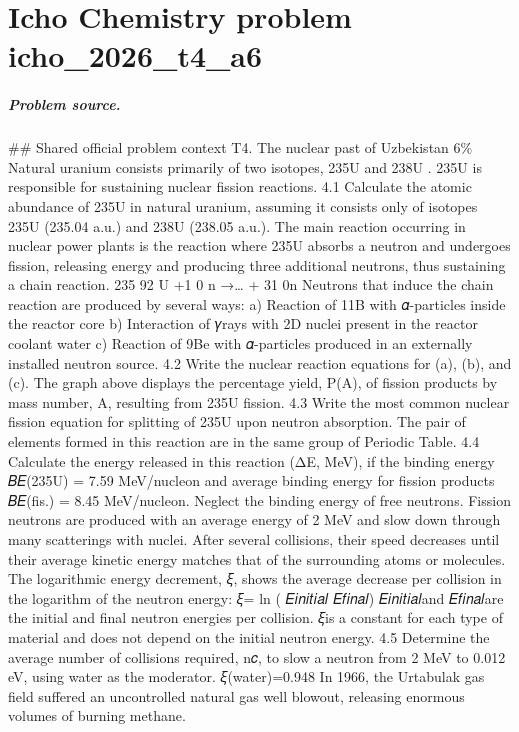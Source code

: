 
\chapter{Icho Chemistry problem icho\_2026\_t4\_a6}
\label{ch:IChO2026Problems_problem_icho_2026_t4_a6}

\paragraph{Problem source.}
\#\# Shared official problem context
T4. The nuclear past of Uzbekistan 6\% Natural uranium consists primarily of two isotopes, 235U and 238U . 235U is responsible for sustaining nuclear fission reactions. 4.1 Calculate the atomic abundance of 235U in natural uranium, assuming it consists only of isotopes 235U (235.04 a.u.) and 238U (238.05 a.u.). The main reaction occurring in nuclear power plants is the reaction where 235U absorbs a neutron and undergoes fission, releasing energy and producing three additional neutrons, thus sustaining a chain reaction. 235 92 U +1 0 n →… + 31 0n Neutrons that induce the chain reaction are produced by several ways: a) Reaction of 11B with 𝛼-particles inside the reactor core b) Interaction of 𝛾rays with 2D nuclei present in the reactor coolant water c) Reaction of 9Be with 𝛼-particles produced in an externally installed neutron source. 4.2 Write the nuclear reaction equations for (a), (b), and (c). The graph above displays the percentage yield, P(A), of fission products by mass number, A, resulting from 235U fission. 4.3 Write the most common nuclear fission equation for splitting of 235U upon neutron absorption. The pair of elements formed in this reaction are in the same group of Periodic Table. 4.4 Calculate the energy released in this reaction (ΔE, MeV), if the binding energy 𝐵𝐸(235U) = 7.59 MeV/nucleon and average binding energy for fission products 𝐵𝐸(fis.) = 8.45 MeV/nucleon. Neglect the binding energy of free neutrons. Fission neutrons are produced with an average energy of 2 MeV and slow down through many scatterings with nuclei. After several collisions, their speed decreases until their average kinetic energy matches that of the surrounding atoms or molecules. The logarithmic energy decrement, 𝜉, shows the average decrease per collision in the logarithm of the neutron energy: 𝜉= ln ( 𝐸𝑖𝑛𝑖𝑡𝑖𝑎𝑙 𝐸𝑓𝑖𝑛𝑎𝑙) 𝐸𝑖𝑛𝑖𝑡𝑖𝑎𝑙and 𝐸𝑓𝑖𝑛𝑎𝑙are the initial and final neutron energies per collision. 𝜉is a constant for each type of material and does not depend on the initial neutron energy. 4.5 Determine the average number of collisions required, n𝑐, to slow a neutron from 2 MeV to 0.012 eV, using water as the moderator. 𝜉(water)=0.948 In 1966, the Urtabulak gas field suffered an uncontrolled natural gas well blowout, releasing enormous volumes of burning methane.

